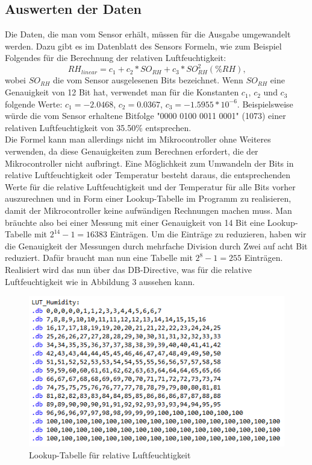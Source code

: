 \documentclass[]{article}
\begin{document}
\subsection{Auswerten der Daten}
Die Daten, die man vom Sensor erhält, müssen für die Ausgabe umgewandelt werden. Dazu gibt es im Datenblatt des Sensors Formeln, wie zum Beispiel Folgendes für die Berechnung der relativen Luftfeuchtigkeit:
\begin{equation*}
RH_{linear} = c_1 + c_2*SO_{RH} + c_3*SO_{RH}^{2} \left(\%RH\right)\textbf{,}
\end{equation*}
wobei $SO_{RH}$ die vom Sensor ausgelesenen Bits bezeichnet. Wenn $SO_{RH}$ eine Genauigkeit von 12 Bit hat, verwendet man für die Konstanten $c_1$, $c_2$ und $c_3$ folgende Werte: $c_1 = -2.0468$, $c_2 = 0.0367$, $c_3 = -1.5955*10^{-6}$.
Beispielsweise würde die vom Sensor erhaltene Bitfolge "0000 0100 0011 0001" (1073) einer relativen Luftfeuchtigkeit von 35.50\% entsprechen.\\
Die Formel kann man allerdings nicht im Mikrocontroller ohne Weiteres verwenden, da diese Genauigkeiten zum Berechnen erfordert, die der Mikrocontroller nicht aufbringt. Eine Möglichkeit zum Umwandeln der Bits in relative Luftfeuchtigkeit oder Temperatur besteht daraus, die entsprechenden Werte für die relative Luftfeuchtigkeit und der Temperatur für alle Bits vorher auszurechnen und in Form einer Lookup-Tabelle im Programm zu realisieren, damit der Mikrocontroller keine aufwändigen Rechnungen machen muss. Man bräuchte also bei einer Messung mit einer Genauigkeit von 14 Bit eine Lookup-Tabelle mit $2^{14}-1 = 16383$ Einträgen. Um die Einträge zu reduzieren, haben wir die Genauigkeit der Messungen durch mehrfache Division durch Zwei auf acht Bit reduziert. Dafür braucht man nun eine Tabelle mit $2^8-1 = 255$ Einträgen. Realisiert wird das nun über das DB-Directive, was für die relative Luftfeuchtigkeit wie in Abbildung 3 aussehen kann.
\begin{figure}[h]
	\centering
	\includegraphics[width=0.7\columnwidth]{LUT.png}
	\caption{Lookup-Tabelle für relative Luftfeuchtigkeit}
\end{figure}
\end{document}
